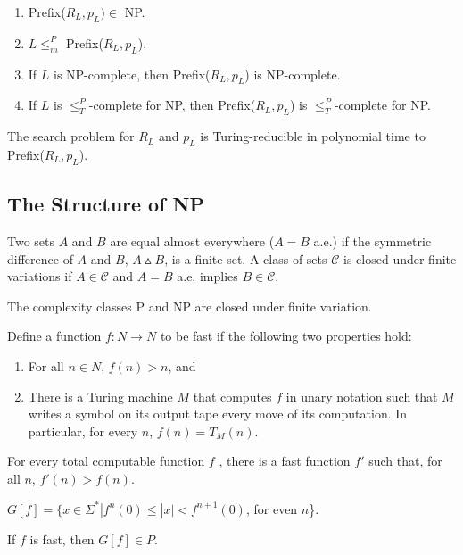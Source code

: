 \begin{enumerate}
  \item Prefix($R_L,p_ L) \in$ NP.
  \item $L \le^P_m$ Prefix($R_L,p_ L$).
  \item If $L$ is NP-complete, then Prefix($R_L,p_L$) is NP-complete.
  \item If $L$ is $\le^P_T$-complete for NP, then Prefix($R_L,p_ L$) is
    $\le^P_T$-complete for NP.
\end{enumerate}

 The search problem for $R_L$ and $p_L$ is Turing-reducible in
polynomial time to Prefix($R_L,p_L$).

\subsection{The Structure of NP}

 Two sets $A$ and $B$ are equal almost everywhere ($A = B$ a.e.)
if the symmetric difference of $A$ and $B$, $A \vartriangle B$, is a finite set.
A class of sets $\mathscr{C}$ is closed under finite variations if $A \in
\mathscr{C}$ and $A = B$ a.e. implies $B \in \mathscr{C}$.

The complexity classes P and NP are closed under finite variation.

 Define a function $f : N \rightarrow N$ to be fast if
the following two properties hold:
\begin{enumerate}
  \item For all $n \in N$, $f(n) > n$, and
  \item There is a Turing machine $M$ that computes $f$ in unary notation such
    that $M$ writes a symbol on its output tape every move of its computation. In particular,
    for every $n$, $f(n) = T_M(n)$.
\end{enumerate}

 For every total computable function $f$ , there is a fast
function $f'$ such that, for all $n$, $f'(n) > f(n)$.

 $G[f] = \{ x \in \Sigma^* | f^n(0) \le |x| < f^{n+1}(0)$, for even
$n$\}.

 If $f$ is fast, then $G[f] \in P$.


